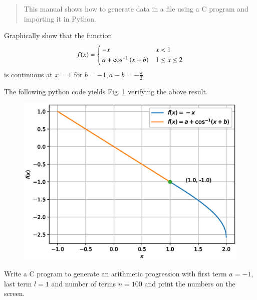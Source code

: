 \documentclass[journal,12pt,twocolumn]{IEEEtran}
\begin{document}
\bigskip

\begin{abstract}
This manual shows how to generate data in a file using a C program and importing it in Python.  
\end{abstract}

\begin{problem}
Graphically show that the function
%
\begin{equation}
\label{eq:fx}
f(x)=
\begin{cases}
-x & x < 1 \\
a + \cos^{-1}\left(x + b\right) & 1 \leq x \leq 2
\end{cases}
\end{equation}
%
is continuous at $x = 1$ for $b = -1, a - b =  - \frac{\pi}{2}$.  
\end{problem}
\solution
%
The following python code yields Fig. \ref{fig_5} verifying the above result.

\begin{figure}[!ht]
\begin{center}
\includegraphics[width=\columnwidth]{./figs/ee16b1005}
\end{center}
\label{fig_5}	
\end{figure}
%
\begin{problem}
Write a C program to generate an arithmetic progression with first term $a=-1$, last term $l=1$ and number of terms $n=100$ and print the numbers on the screen.
\end{problem}
\end{document}
